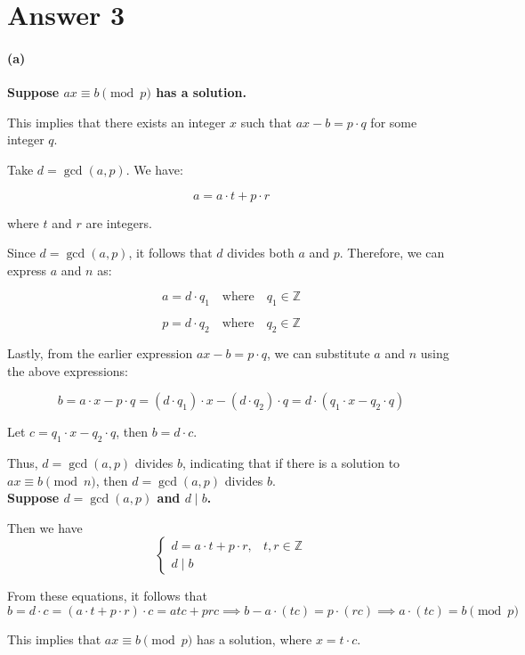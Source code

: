\documentclass[12pt]{article}
\begin{document}
\section*{Answer 3}

\paragraph{(a)}
\textbf{Suppose $ax \equiv b \pmod{p}$ has a solution.}

This implies that there exists an integer $x$ such that $ax - b = p \cdot q$ for some integer $q$.

Take $d = \gcd(a, p)$. We have:

\[
a = a \cdot t + p \cdot r
\]

where $t$ and $r$ are integers.

Since $d = \gcd(a, p)$, it follows that $d$ divides both $a$ and $p$. Therefore, we can express $a$ and $n$ as:

\[
a = d \cdot q_1 \quad \text{where} \quad q_1 \in \mathbb{Z}
\]

\[
p = d \cdot q_2 \quad \text{where} \quad q_2 \in \mathbb{Z}
\]

Lastly, from the earlier expression $ax - b = p \cdot q$, we can substitute $a$ and $n$ using the above expressions:

\[
b = a \cdot x - p \cdot q = (d \cdot q_1) \cdot x - (d \cdot q_2) \cdot q = d \cdot (q_1 \cdot x - q_2 \cdot q)
\]

Let $c = q_1 \cdot x - q_2 \cdot q$, then $b = d \cdot c$.

Thus, $d = \gcd(a, p)$ divides $b$, indicating that if there is a solution to $ax \equiv b \pmod{n}$, then $d = \gcd(a, p)$ divides $b$. \\

\textbf{Suppose $d = \gcd(a, p)$ and $d \mid b$.}

Then we have
\[
\begin{cases}
    d = a \cdot t + p \cdot r, & \text{$t, r \in \mathbb{Z}$} \\
    d \mid b
\end{cases}
\]

From these equations, it follows that
\[
b = d \cdot c = (a \cdot t + p \cdot r) \cdot c = atc + prc \implies b - a \cdot (tc) = p \cdot (rc) \implies a \cdot (tc) = b \pmod{p}
\]

This implies that $ax \equiv b \pmod{p}$ has a solution, where $x = t \cdot c$. \\
\end{document}
